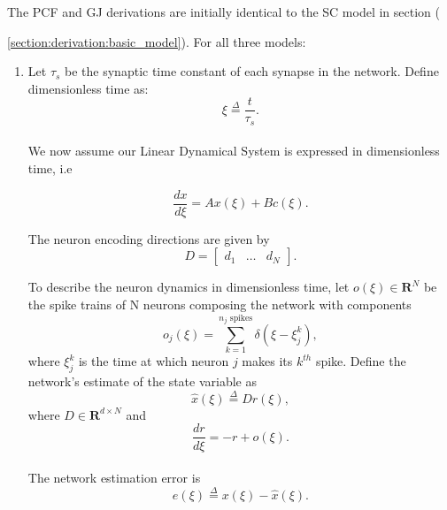  The PCF and GJ derivations are initially identical to the SC model in section ({\ref{section:derivation:basic_model}). For all three models: 

\begin{enumerate}
    \item Let $\tau_s$ be the synaptic time constant of each synapse in the network. Define dimensionless time as:
    \begin{equation*}
        \xi \overset{\Delta}{=} \frac{t}{\tau_s}.
    \end{equation*}\\
    We now assume our Linear Dynamical System is expressed in dimensionless time, i.e
    
    \begin{equation}
        \label{eq:derivation:pcf_gj:lds_dimensionless}
        \frac{dx}{d\xi} = Ax(\xi) + B c(\xi).
    \end{equation}
    
    The neuron encoding directions are given by 
	$$
	D = \begin{bmatrix}
	d_1 & \hdots & d_N
	\end{bmatrix}.
	$$
	   
    To describe the neuron dynamics in dimensionless time, let $o(\xi) \in \mathbf{R}^{N}$ be the spike trains of N neurons composing the network with components
    \begin{equation*}
        o_j(\xi) = \sum_{k=1}^{\text{$n_j$ spikes}} \delta(\xi - \xi_{j}^{k}),
    \end{equation*}
    where $\xi_j^k$ is the time at which neuron $j$ makes its $k^{th}$ spike. 
    Define the network's estimate of the state variable as
    \begin{equation}
        \label{eq:derivation:pcf_gj:xhat}
        \hat{x}(\xi)
        \overset{\Delta}{=} D r(\xi),
    \end{equation}
    where $D \in \mathbf{R}^{d \times N}$ and 
    \begin{equation}
    \label{eq:derivation:pcf_gj:rdot}
        \frac{dr}{d \xi} = -r + o(\xi).
    \end{equation}\\

    The network estimation error is
    \begin{equation}
    \label{eq:derivation:pcf_gj:error_def}
        e(\xi) \overset{\Delta}{=} x(\xi) - \hat{x}(\xi).
    \end{equation}
    


\end{enumerate}}
